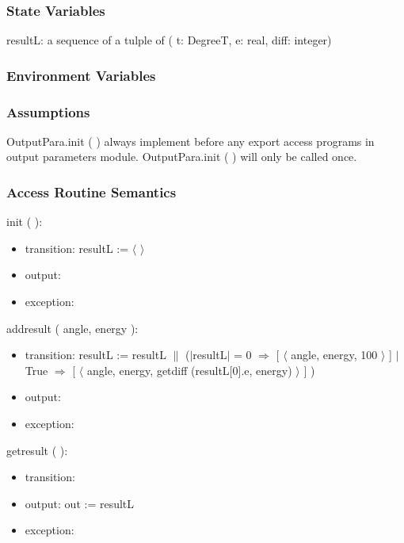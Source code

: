 \documentclass[12pt, titlepage]{article}
\begin{document}
\subsubsection{State Variables}
resultL: a sequence of a tulple  of ( t: DegreeT, e: real, diff: integer)\\


\subsubsection{Environment Variables}


\subsubsection{Assumptions}
OutputPara.init ( ) always implement before any export access programs in output parameters module.
OutputPara.init ( ) will only be called once.

\subsubsection{ Access Routine Semantics}

\noindent  init ( ):
\begin{itemize}
\item transition: resultL := $\langle $ $ \rangle$
\item output:
\item exception: 
\end{itemize}

\noindent  addresult ( angle, energy ):
\begin{itemize}
\item transition: resultL := resultL $\|$ ($|$resultL$|$ = 0 $\Rightarrow$ [ $\langle$
  angle, energy, 100 $\rangle$ ] $|$ True $\Rightarrow$ [
  $\langle$ angle, energy, getdiff (resultL[0].e, energy) $\rangle$ ] )

\item output:
\item exception: 
\end{itemize}

\noindent  getresult (  ):
\begin{itemize}
\item transition: 
\item output: out := resultL
\item exception: 
\end{itemize}
\end{document}
